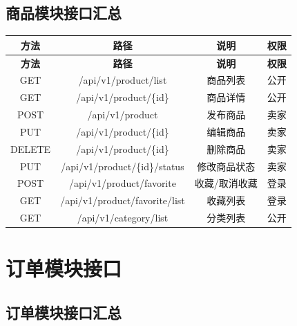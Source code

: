 \documentclass[12pt,a4paper,UTF8]{ctexart}
\begin{document}
\subsection{商品模块接口汇总}

\begin{longtable}{|c|c|c|c|}
    \hline
    \textbf{方法} & \textbf{路径} & \textbf{说明} & \textbf{权限} \\
    \hline
    \endfirsthead
    \hline
    \textbf{方法} & \textbf{路径} & \textbf{说明} & \textbf{权限} \\
    \hline
    \endhead
    \hline
    \endfoot

    GET & /api/v1/product/list & 商品列表 & 公开 \\
    \hline
    GET & /api/v1/product/\{id\} & 商品详情 & 公开 \\
    \hline
    POST & /api/v1/product & 发布商品 & 卖家 \\
    \hline
    PUT & /api/v1/product/\{id\} & 编辑商品 & 卖家 \\
    \hline
    DELETE & /api/v1/product/\{id\} & 删除商品 & 卖家 \\
    \hline
    PUT & /api/v1/product/\{id\}/status & 修改商品状态 & 卖家 \\
    \hline
    POST & /api/v1/product/favorite & 收藏/取消收藏 & 登录 \\
    \hline
    GET & /api/v1/product/favorite/list & 收藏列表 & 登录 \\
    \hline
    GET & /api/v1/category/list & 分类列表 & 公开 \\
    \hline
\end{longtable}

\section{订单模块接口}

\subsection{订单模块接口汇总}
\end{document}
